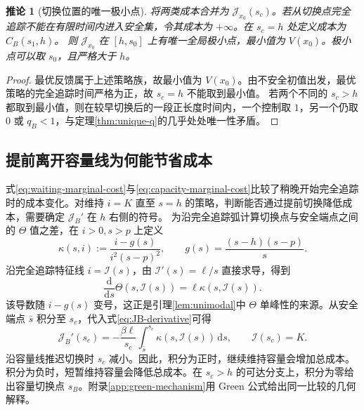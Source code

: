 \documentclass[lang=cn,a4paper,newtx]{elegantpaper}
\theoremstyle{plain}
\newtheorem{papercorollary}[theorem]{推论}
\theoremstyle{definition}
\newcommand{\dd}{\,\mathrm d}
\begin{document}
\begin{papercorollary}[切换位置的唯一极小点]
\label{cor:one-dimensional-min}
将两类成本合并为 $\mathcal J_{x_0}(s_c)$。若从切换点完全追踪不能在有限时间内进入安全集，令其成本为 $+\infty$。在 $s_c=h$ 处定义成本为 $C_B(s_1,h)$。
则 $\mathcal J_{x_0}$ 在 $[h,s_0]$ 上有唯一全局极小点，最小值为 $V(x_0)$。极小点可以取 $s_0$，且严格大于 $h$。
\end{papercorollary}
\begin{proof}
最优反馈属于上述策略族，故最小值为 $V(x_0)$。由不安全初值出发，最优策略的完全追踪时间严格为正，故 $s_c=h$ 不能取到最小值。
若两个不同的 $s_c>h$ 都取到最小值，则在较早切换后的一段正长度时间内，一个控制取 $1$，另一个仍取 $0$ 或 $q_B<1$，与定理\ref{thm:unique-q}的几乎处处唯一性矛盾。
\end{proof}

\subsection{提前离开容量线为何能节省成本}
\label{sec:switching-mechanism}
式\eqref{eq:waiting-marginal-cost}与\eqref{eq:capacity-marginal-cost}比较了稍晚开始完全追踪时的成本变化。对维持 $i=K$ 直至 $s=h$ 的策略，判断能否通过提前切换降低成本，需要确定 $\mathcal J_B'$ 在 $h$ 右侧的符号。
为沿完全追踪弧计算切换点与安全端点之间的 $\Theta$ 值之差，在 $i>0,s>p$ 上定义
\begin{equation}
 \kappa(s,i):=\frac{i-g(s)}{i^2(s-p)^2},
 \qquad g(s)=\frac{(s-h)(s-p)}s.
 \label{eq:mechanism-kappa}
\end{equation}
沿完全追踪特征线 $i=\mathcal I(s)$，由 $\mathcal I'(s)=\ell/s$ 直接求导，得到
\begin{equation}
 \frac{\mathrm d}{\mathrm ds}\Theta(s,\mathcal I(s))
 =\ell\kappa(s,\mathcal I(s)).
 \label{eq:theta-characteristic-derivative}
\end{equation}
该导数随 $i-g(s)$ 变号，这正是引理\ref{lem:unimodal}中 $\Theta$ 单峰性的来源。从安全端点 $\bar s$ 积分至 $s_c$，代入式\eqref{eq:JB-derivative}可得
\begin{equation}
 \mathcal J_B'(s_c)
 =-\frac{\beta\ell}{s_c}
   \int_{\bar s}^{s_c}\kappa(s,\mathcal I(s))\dd s,
 \qquad \mathcal I(s_c)=K.
 \label{eq:JB-curvature-integral}
\end{equation}
沿容量线推迟切换时 $s_c$ 减小。因此，积分为正时，继续维持容量会增加总成本。积分为负时，短暂维持容量会降低总成本。在 $s_c>h$ 的可达分支上，积分为零给出容量切换点 $s_B$。附录\ref{app:green-mechanism}用 Green 公式给出同一比较的几何解释。
\end{document}
